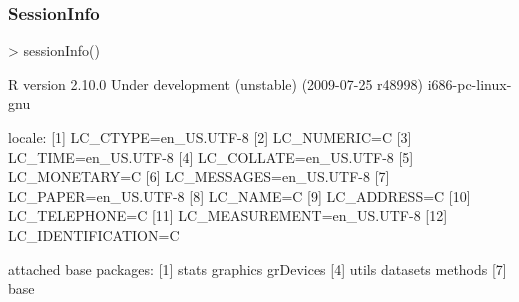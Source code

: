 \begin{frame}
  \frametitle{SessionInfo} \scriptsize
\begin{Schunk}
\begin{Sinput}
> sessionInfo()
\end{Sinput}
\begin{Soutput}
R version 2.10.0 Under development (unstable) (2009-07-25 r48998) 
i686-pc-linux-gnu 

locale:
 [1] LC_CTYPE=en_US.UTF-8      
 [2] LC_NUMERIC=C              
 [3] LC_TIME=en_US.UTF-8       
 [4] LC_COLLATE=en_US.UTF-8    
 [5] LC_MONETARY=C             
 [6] LC_MESSAGES=en_US.UTF-8   
 [7] LC_PAPER=en_US.UTF-8      
 [8] LC_NAME=C                 
 [9] LC_ADDRESS=C              
[10] LC_TELEPHONE=C            
[11] LC_MEASUREMENT=en_US.UTF-8
[12] LC_IDENTIFICATION=C       

attached base packages:
[1] stats     graphics  grDevices
[4] utils     datasets  methods  
[7] base     
\end{Soutput}
\end{Schunk}
\end{frame}




